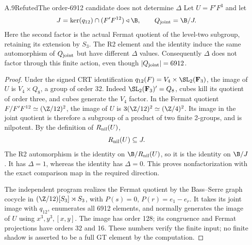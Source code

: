 \begin{statement}{A.9}{Refuted}{The order-6912 candidate does not determine $\Delta$}
Let $U=F'F^3$ and let
\[
 J=\ker(q_{12})\cap(F'F^{12})\triangleleft\B,
 \qquad Q_{\rm joint}=\B/J.
\]
Here the second factor is the actual Fermat quotient of the
level-two subgroup, retaining its extension by $S_3$.
The R2 element and the identity induce the same automorphism of
$Q_{\rm joint}$ but have different $\Delta$ values. Consequently
$\Delta$ does not factor through this finite action, even though
$|Q_{\rm joint}|=6912$.
\end{statement}
\begin{proof}
Under the signed CRT identification
$q_{12}(F)=V_4\times\SL_2(\mathbf F_3)$, the image of $U$ is
$V_4\times Q_8$, a group of order 32. Indeed
$\SL_2(\mathbf F_3)'=Q_8$, cubes kill its quotient of order three,
and cubes generate the $V_4$ factor. In the Fermat quotient
$F/F'F^{12}\simeq(\Z/12)^2$, the image of $U$ is
$3(\Z/12)^2\simeq(\Z/4)^2$. Its image in the joint quotient
is therefore a subgroup of a product of two finite 2-groups,
and is nilpotent. By the definition of $R_{\rm nil}(U)$,
\[
 R_{\rm nil}(U)\subseteq J.
\]
The R2 automorphism is the identity on $\B/R_{\rm nil}(U)$,
so it is the identity on $\B/J$. It has $\Delta=1$, whereas
the identity has $\Delta=0$. This proves nonfactorization with
the exact comparison map in the required direction.

The independent program realizes the Fermat quotient by the
Bass--Serre graph cocycle in $(\Z/12)[S_3]\rtimes S_3$, with
$P(s)=0$, $P(r)=e_1-e_r$. It takes its joint image with $q_{12}$,
enumerates all 6912 elements, and normally generates the image
of $U$ using $x^3,y^3,[x,y]$. The image has order 128; its
congruence and Fermat projections have orders 32 and 16.
These numbers verify the finite input; no finite shadow is
asserted to be a full GT element by the computation.
\end{proof}

